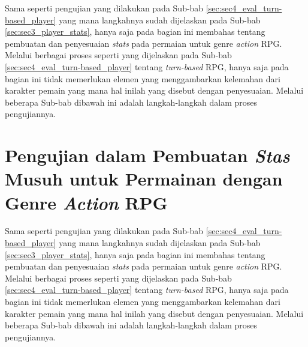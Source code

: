Sama seperti pengujian yang dilakukan pada Sub-bab \ref{sec:sec4_eval_turn-based_player} yang mana langkahnya sudah dijelaskan pada Sub-bab \ref{sec:sec3_player_stats}, hanya saja pada bagian ini membahas tentang pembuatan dan penyesuaian \textit{stats} pada permaian untuk genre \textit{action} RPG. Melalui berbagai proses seperti yang dijelaskan pada Sub-bab \ref{sec:sec4_eval_turn-based_player} tentang \textit{turn-based} RPG, hanya saja pada bagian ini tidak memerlukan elemen yang menggambarkan kelemahan dari karakter pemain yang mana hal inilah yang disebut dengan penyesuaian. Melalui beberapa Sub-bab dibawah ini adalah langkah-langkah dalam proses pengujiannya.
\vspace{1ex}


\section{Pengujian dalam Pembuatan \textit{Stas} Musuh untuk Permainan dengan Genre \textit{Action} RPG}
\label{sec:sec4_eval_action_enemy}
\vspace{1ex}

Sama seperti pengujian yang dilakukan pada Sub-bab \ref{sec:sec4_eval_turn-based_player} yang mana langkahnya sudah dijelaskan pada Sub-bab \ref{sec:sec3_player_stats}, hanya saja pada bagian ini membahas tentang pembuatan dan penyesuaian \textit{stats} pada permaian untuk genre \textit{action} RPG. Melalui berbagai proses seperti yang dijelaskan pada Sub-bab \ref{sec:sec4_eval_turn-based_player} tentang \textit{turn-based} RPG, hanya saja pada bagian ini tidak memerlukan elemen yang menggambarkan kelemahan dari karakter pemain yang mana hal inilah yang disebut dengan penyesuaian. Melalui beberapa Sub-bab dibawah ini adalah langkah-langkah dalam proses pengujiannya.